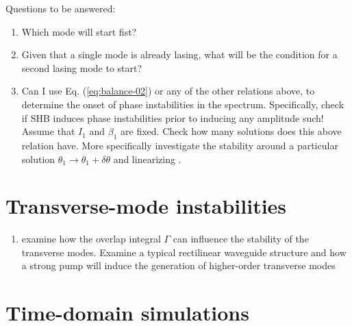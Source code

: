 \documentclass[preprint,secnumarabic,amssymb, nobibnotes, aip, prd]{revtex4-1}
\begin{document}
 
 Questions to be answered:
 \begin{enumerate}
 	\item Which mode will start fist?
 	\item Given that a single mode is already lasing, what will be the condition for a second lasing mode to start?
 	\item Can I use Eq. (\ref{eq:balance-02}) or any of the other relations above, to determine the onset of phase instabilities in the spectrum. Specifically, check if SHB induces phase instabilities prior to inducing any amplitude such! Assume that $I_1$ and $\beta_1$ are fixed. Check how many solutions does this above relation have. More specifically investigate the stability around a particular solution $\theta_1 \rightarrow \theta_1+\delta\theta$ and linearizing .
 \end{enumerate}

\section{Transverse-mode instabilities}

\begin{enumerate}
	\item examine how the overlap integral $\Gamma$ can influence the stability of the transverse modes. Examine a typical rectilinear waveguide structure and how a strong pump will induce the generation of higher-order transverse modes 
\end{enumerate}

\section{Time-domain simulations}


\end{document}
